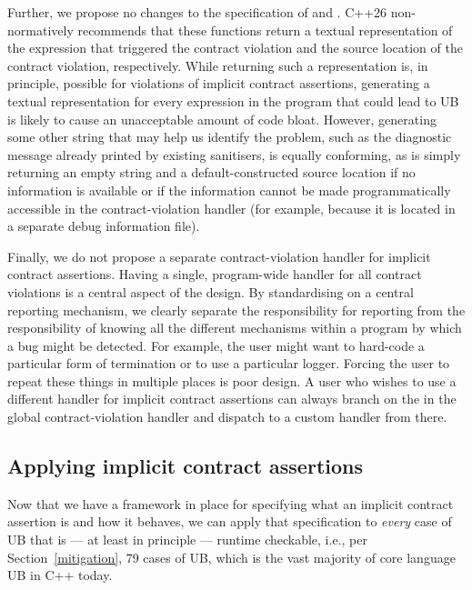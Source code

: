 Further, we propose no changes to the specification of  and . C++26 non-normatively recommends that these functions return a textual representation of the expression that triggered the contract violation and the source location of the contract violation, respectively. While returning such a representation is, in principle, possible for violations of implicit contract assertions, generating a textual representation for every expression in the program that could lead to UB is likely to cause an unacceptable amount of code bloat. However, generating some other string that may help us identify the problem, such as the diagnostic message already printed by existing sanitisers, is equally conforming, as is simply returning an empty string and a default-constructed source location if no information is available or if the information cannot be made programmatically accessible in the contract-violation handler (for example,
because it is located in a separate debug information file). 

Finally, we do not propose a separate contract-violation handler for implicit contract assertions. Having a single, program-wide handler for all contract violations is a central aspect of the \cite{P2900R14} design. By standardising on a central reporting mechanism, we clearly separate the responsibility for reporting from the responsibility of knowing all the different mechanisms within a program by which a bug might be detected. For example, the user might want to hard-code a particular form of termination or to use a particular logger. Forcing the user to repeat these things in multiple places is poor design. A user who wishes to use a different handler for implicit contract assertions can always branch on the  in the global contract-violation handler and dispatch to a custom handler from there.

\subsection{Applying implicit contract assertions}
\label{applyicas}

Now that we have a framework in place for specifying what an implicit contract assertion is and how it behaves, we can apply that specification to \emph{every} case of UB  that is --- at least in principle --- runtime checkable, i.e., per Section~\ref{mitigation}, 79 cases of UB, which is the vast majority of core language UB in C++ today.

